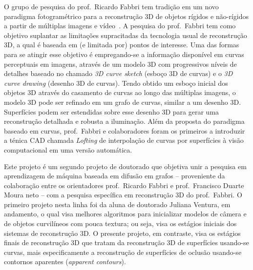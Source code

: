 \documentclass[a4paper,titlepage]{article}
\begin{document}
O grupo de pesquisa do prof.\ Ricardo Fabbri tem tradição em um novo paradigma
fotogramétrico para a reconstrução 3D de objetos rígidos e não-rígidos a partir
de múltiplas imagens e
vídeo~\cite{Fabbri:Kimia:IJCV2016,Fabbri:PhD:2010,Fabbri:Giblin:Kimia:ECCV12,Fabbri:Kimia:EMMCVPR2005,Fabbri:Kimia:CVPR10,Usumezbas:Fabbri:Kimia:CVPR:2017,Usumezbas:Fabbri:Kimia:ECCV16}.
A pesquisa do prof.\ Fabbri tem como objetivo suplantar as limitações
supracitadas da tecnologia usual de reconstrução 3D, a qual é baseada em (e
limitada por) pontos de interesse. Uma das formas para se atingir esse objetivo
é empregando-se a informação disponível em curvas perceptuais em imagens,
através de um modelo 3D com progressivos níveis de detalhes baseado no chamado
\emph{3D curve sketch} (esboço 3D de curvas) e o \emph{3D curve drawing}
(desenho 3D de curvas). Tendo obtido um esboço inicial dos objetos 3D através do
casamento de curvas ao longo das múltiplas imagens, o modelo 3D pode ser
refinado em um grafo de curvas, similar a um desenho 3D. Superfícies podem ser
estendidas sobre esse desenho 3D para gerar uma reconstrução detalhada e
robusta a iluminação. Além da proposta do paradigma baseado em curvas, prof.\
Fabbri e colaboradores foram os primeiros a introduzir a ténica
CAD chamada \emph{Lofting} de interpolação de curvas por superfícies à visão
computacional em uma versão automática.

Este projeto é um segundo projeto de doutorado que objetiva unir a pesquisa em
aprendizagem de máquina baseada em difusão em grafos -- proveniente da
colaboração entre os orientadores prof.\ Ricardo Fabbri e prof.\ Francisco
Duarte Moura neto --  com a pesquisa específica em reconstrução 3D do prof.\
Fabbri. O primeiro projeto nesta linha foi da aluna de doutorado Juliana
Ventura, em andamento, o qual visa melhores algoritmos para inicializar modelos
de câmera e de objetos curvilíneos com pouca textura; ou seja, visa os estágios
iniciais dos sistemas de reconstrução 3D. O presente projeto, em
contraste, visa os estágios finais de reconstrução 3D que tratam da reconstrução
3D de superfícies usando-se curvas, mais especificamente a reconstrução de
superfícies de oclusão usando-se contornos aparentes (\emph{apparent contours}).
\end{document}
